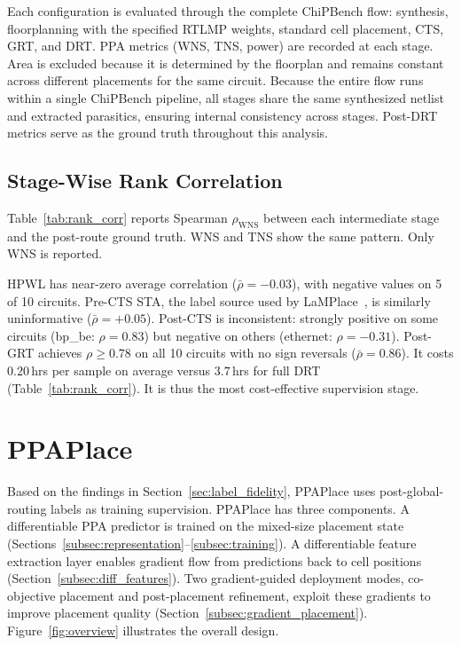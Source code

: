 \documentclass[sigconf,anonymous,review,9pt]{acmart}
\begin{document}
Each configuration is evaluated through the complete ChiPBench flow:
synthesis, floorplanning with the specified RTLMP weights, standard cell
placement, CTS, GRT, and DRT. PPA metrics (WNS, TNS, power) are
recorded at each stage. Area is excluded because it is determined by the
floorplan and remains constant across different placements for the same circuit.
Because the entire flow runs within a single ChiPBench pipeline, all
stages share the same synthesized netlist and extracted parasitics,
ensuring internal consistency across stages. Post-DRT metrics serve as
the ground truth throughout this analysis.

\subsection{Stage-Wise Rank Correlation}

Table~\ref{tab:rank_corr} reports Spearman $\rho_{\text{WNS}}$ between
each intermediate stage and the post-route ground truth. WNS and TNS
show the same pattern. Only WNS is reported. 

HPWL has near-zero
average correlation ($\bar\rho = -0.03$), with negative values on 5 of
10 circuits. Pre-CTS STA, the label source used by
LaMPlace~\cite{lamplace2025}, is similarly uninformative
($\bar\rho = +0.05$). Post-CTS is inconsistent: strongly positive on
some circuits (bp\_be: $\rho = 0.83$) but negative on others
(ethernet: $\rho = -0.31$). Post-GRT achieves $\rho \geq 0.78$ on all
10 circuits with no sign reversals ($\bar\rho = 0.86$). It costs
$0.20$\,hrs per sample on average versus $3.7$\,hrs for full DRT
(Table~\ref{tab:rank_corr}). It is thus the most cost-effective
supervision stage.


\section{PPAPlace}
\label{sec:method}

Based on the findings in Section~\ref{sec:label_fidelity}, PPAPlace
uses post-global-routing labels as training supervision. PPAPlace
has three components. A differentiable PPA predictor is trained on the
mixed-size placement state
(Sections~\ref{subsec:representation}--\ref{subsec:training}). A
differentiable feature extraction layer enables gradient flow from
predictions back to cell positions
(Section~\ref{subsec:diff_features}). Two gradient-guided deployment
modes, co-objective placement and post-placement refinement, exploit
these gradients to improve placement quality
(Section~\ref{subsec:gradient_placement}).
Figure~\ref{fig:overview} illustrates the overall design.
\end{document}
